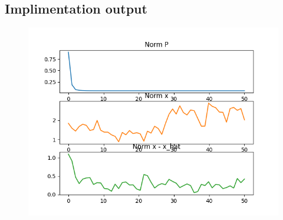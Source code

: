 \documentclass{article}
\begin{document}
\subsection*{Implimentation output}
\begin{figure}[H]
\centering
\includegraphics[width=1\textwidth]{Figure_kalman.png}
\label{fig:kalman_filter}
\end{figure}
\end{document}
